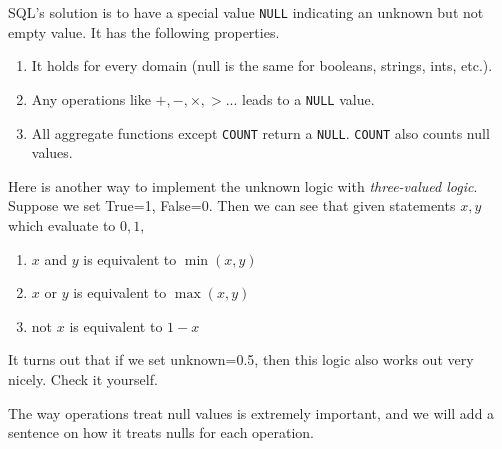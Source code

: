 \documentclass{article}
\begin{document}
      \begin{definition}
        SQL's solution is to have a special value \texttt{NULL} indicating an unknown but not empty value. It has the following properties. 
        \begin{enumerate}
          \item It holds for every domain (null is the same for booleans, strings, ints, etc.). 
          \item Any operations like $+, -, \times, >$... leads to a \texttt{NULL} value. 
          \item All aggregate functions except \texttt{COUNT} return a \texttt{NULL}. \texttt{COUNT} also counts null values. 
        \end{enumerate}
      \end{definition}

      \begin{theorem}
        Here is another way to implement the unknown logic with \textit{three-valued logic}. Suppose we set True=1, False=0. Then we can see that given statements $x, y$ which evaluate to $0, 1$, 
        \begin{enumerate}
          \item $x$ and $y$ is equivalent to $\min(x, y)$
          \item $x$ or $y$ is equivalent to $\max(x, y)$ 
          \item not $x$ is equivalent to $1 - x$
        \end{enumerate}
        It turns out that if we set unknown=0.5, then this logic also works out very nicely. Check it yourself. 
      \end{theorem}

      The way operations treat null values is extremely important, and we will add a sentence on how it treats nulls for each operation. 
\end{document}

